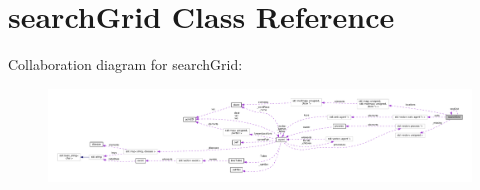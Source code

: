 \hypertarget{classsearchGrid}{}\section{search\+Grid Class Reference}
\label{classsearchGrid}


Collaboration diagram for search\+Grid\+:\nopagebreak
\begin{figure}[H]
\begin{center}
\leavevmode
\includegraphics[width=350pt]{classsearchGrid__coll__graph}
\end{center}
\end{figure}
